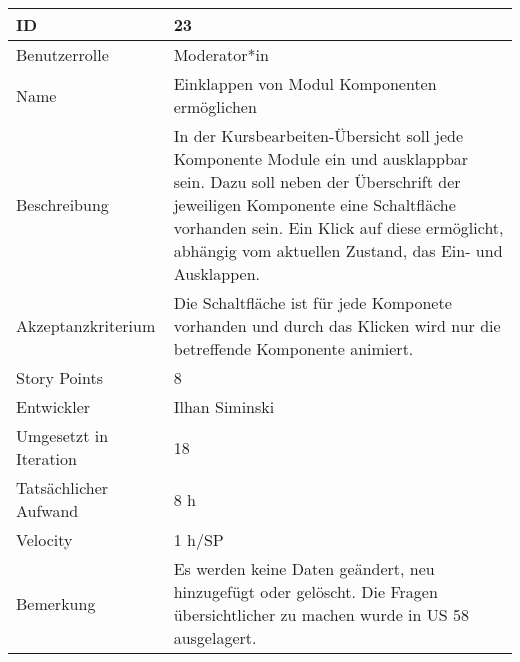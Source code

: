 \begin{tabularx}{\textwidth}{|p{}|X|}
	\hline
	ID & 23\\
	\hline
	Benutzerrolle & Moderator*in\\
	\hline
	Name & Einklappen von Modul Komponenten ermöglichen\\
	\hline
	Beschreibung & In der Kursbearbeiten-Übersicht soll jede Komponente Module ein und ausklappbar sein.
		Dazu soll neben der Überschrift der jeweiligen Komponente eine Schaltfläche vorhanden sein.
		Ein Klick auf diese ermöglicht, abhängig vom aktuellen Zustand, das Ein- und Ausklappen. \\
	\hline
	Akzeptanzkriterium & Die Schaltfläche ist für jede Komponete vorhanden und durch das Klicken wird nur die betreffende Komponente animiert.\\
	\hline
	Story Points & 8 \\
	\hline
	Entwickler & Ilhan Siminski\\
	\hline
	Umgesetzt in Iteration & 18\\
	\hline
	Tatsächlicher Aufwand & 8 h\\
	\hline
	Velocity & 1 h/SP\\
	\hline
	Bemerkung & Es werden keine Daten geändert, neu hinzugefügt oder gelöscht. Die Fragen übersichtlicher zu machen wurde in US 58 ausgelagert.\\
	\hline
\end{tabularx}
\vspace{20pt}
